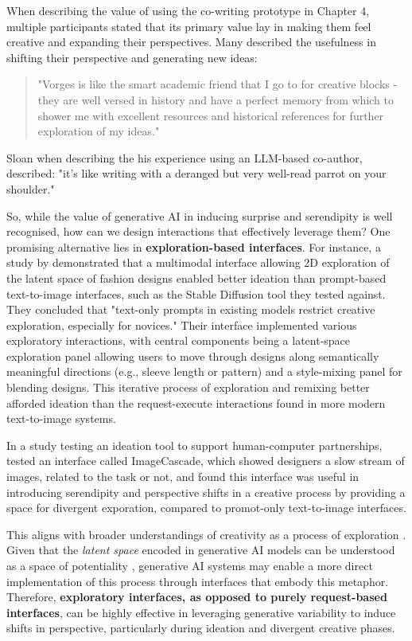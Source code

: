 When describing the value of using the co-writing prototype in Chapter 4, multiple participants stated that its primary value lay in making them feel creative and expanding their perspectives. Many described the usefulness in shifting their perspective and generating new ideas:

\begin{quote}
"Vorges is like the smart academic friend that I go to for creative blocks - they are well versed in history and have a perfect memory from which to shower me with excellent resources and historical references for further exploration of my ideas."
\end{quote}

Sloan \cite{Sloan2016-fj} when describing the his experience using an LLM-based co-author, described: "it’s like writing with a deranged but very well-read parrot on your shoulder."

So, while the value of generative AI in inducing surprise and serendipity is well recognised, how can we design interactions that effectively leverage them? One promising alternative lies in \textbf{exploration-based interfaces}. For instance, a study by \cite{Davis2024-ml} demonstrated that a multimodal interface allowing 2D exploration of the latent space of fashion designs enabled better ideation than prompt-based text-to-image interfaces, such as the Stable Diffusion tool they tested against. They concluded that "text-only prompts in existing models restrict creative exploration, especially for novices." Their interface implemented various exploratory interactions, with central components being a latent-space exploration panel allowing users to move through designs along semantically meaningful directions (e.g., sleeve length or pattern) and a style-mixing panel for blending designs. This iterative process of exploration and remixing better afforded ideation than the request-execute interactions found in more modern text-to-image systems. 

In a study testing an ideation tool to support human-computer partnerships, \cite{Koch2020-gx} tested an interface called ImageCascade, which showed designers a slow stream of images, related to the task or not, and found this interface was useful in introducing serendipity and perspective shifts in a creative process by providing a space for divergent exporation, compared to promot-only text-to-image interfaces.

This aligns with broader understandings of creativity as a process of exploration \cite{Boden1998-yn, Wiggins2019-yj}. Given that the \textit{latent space} encoded in generative AI models can be understood as a space of potentiality \cite{Schaerf2024-gf}, generative AI systems may enable a more direct implementation of this process through interfaces that embody this metaphor. Therefore, \textbf{exploratory interfaces, as opposed to purely request-based interfaces}, can be highly effective in leveraging generative variability to induce shifts in perspective, particularly during ideation and divergent creative phases. 

